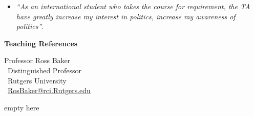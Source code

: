 \documentclass[11pt]{letter} %
\begin{document}
\begin{letter}{}
\begin{itemize}
\item \emph{``As an international student who takes the course for requirement, the TA have greatly increase my interest in politics, increase my awareness of politics''}.

\end{itemize}


{\bf Teaching References}

Professor Ross Baker\\\
Distinguished Professor\\\
Rutgers University\\\
\href{mailto:rosbaker@rci.rutgers.edu}{RosBaker@rci.Rutgers.edu} 



\closing{{\color{white}empty here}}




\end{letter}
\end{document}
